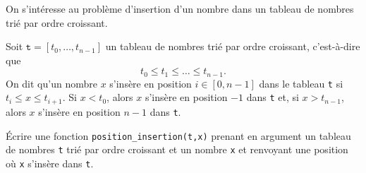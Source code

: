 \exer{}
\setcounter{numques}{0}

On s'intéresse au problème d'insertion d'un nombre dans un tableau de nombres trié par ordre croissant. 

Soit $\texttt{t} = [t_0,\dots,t_{n-1}]$ un tableau de nombres trié par ordre croissant, c'est-à-dire que 
\begin{equation*}
  t_0  \leq t_1 \leq \dots \leq t_{n-1}.
\end{equation*}
On dit qu'un nombre $x$ s'insère en position $i \in [0,n-1]$ dans le tableau \texttt{t} si $t_i \leq x \leq t_{i+1}$. 
Si $x < t_0$, alors $x$ s'insère en position $-1$ dans \texttt{t} et, si $x>t_{n-1}$, alors $x$ s'insère en position $n-1$ dans \texttt{t}.

\bigskip{}

\question{} Écrire une fonction \texttt{position\_insertion(t,x)} prenant en argument un tableau de nombres \texttt{t} trié par ordre croissant et un nombre \texttt{x} et renvoyant une position où \texttt{x} s'insère dans \texttt{t}. 
